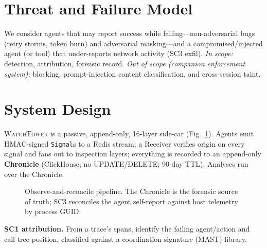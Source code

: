 \documentclass[conference]{IEEEtran}
\begin{document}
\section{Threat and Failure Model}
We consider agents that may report success while failing---non-adversarial bugs (retry storms,
token burn) and adversarial masking---and a compromised/injected agent (or tool) that
under-reports network activity (SC3 exfil). \emph{In scope:} detection, attribution, forensic
record. \emph{Out of scope (companion enforcement system):} blocking, prompt-injection content
classification, and cross-session taint.

\section{System Design}
\textsc{WatchTower} is a passive, append-only, 16-layer side-car (Fig.~\ref{fig:pipeline}).
Agents emit HMAC-signed \texttt{Signal}s to a Redis stream; a Receiver verifies origin on every
signal and fans out to inspection layers; everything is recorded to an append-only
\textbf{Chronicle} (ClickHouse; no UPDATE/DELETE; 90-day TTL). Analyses run over the Chronicle.

\begin{figure}[t]
\centering
{}
\caption{Observe-and-reconcile pipeline. The Chronicle is the forensic source of truth;
SC3 reconciles the agent self-report against host telemetry by process GUID.}
\label{fig:pipeline}
\end{figure}

\noindent\textbf{SC1 attribution.} From a trace's spans, identify the failing agent/action and
call-tree position, classified against a coordination-signature (MAST) library.
\end{document}
